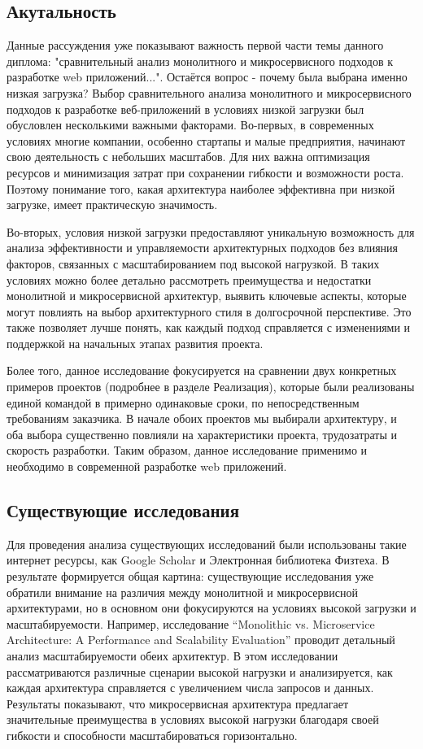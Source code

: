 \subsection{Акутальность}
    
    Данные рассуждения уже показывают важность первой части темы данного диплома: "сравнительный анализ монолитного и микросервисного подходов к разработке web приложений...". Остаётся вопрос - почему была выбрана именно низкая загрузка? Выбор сравнительного анализа монолитного и микросервисного подходов к разработке веб-приложений в условиях низкой загрузки был обусловлен несколькими важными факторами. Во-первых, в современных условиях многие компании, особенно стартапы и малые предприятия, начинают свою деятельность с небольших масштабов. Для них важна оптимизация ресурсов и минимизация затрат при сохранении гибкости и возможности роста. Поэтому понимание того, какая архитектура наиболее эффективна при низкой загрузке, имеет практическую значимость.

    Во-вторых, условия низкой загрузки предоставляют уникальную возможность для анализа эффективности и управляемости архитектурных подходов без влияния факторов, связанных с масштабированием под высокой нагрузкой. В таких условиях можно более детально рассмотреть преимущества и недостатки монолитной и микросервисной архитектур, выявить ключевые аспекты, которые могут повлиять на выбор архитектурного стиля в долгосрочной перспективе. Это также позволяет лучше понять, как каждый подход справляется с изменениями и поддержкой на начальных этапах развития проекта.

    Более того, данное исследование фокусируется на сравнении двух конкретных примеров проектов (подробнее в разделе Реализация), которые были реализованы единой командой в примерно одинаковые сроки, по непосредственным требованиям заказчика. В начале обоих проектов мы выбирали архитектуру, и оба выбора существенно повлияли на характеристики проекта, трудозатраты и скорость разработки. Таким образом, данное исследование применимо и необходимо в современной разработке web приложений.

\subsection{Существующие исследования}
    Для проведения анализа существующих исследований были использованы такие интернет ресурсы, как Google Scholar и Электронная библиотека Физтеха. В результате формируется общая картина: существующие исследования уже обратили внимание на различия между монолитной и микросервисной архитектурами, но в основном они фокусируются на условиях высокой загрузки и масштабируемости. Например, исследование “Monolithic vs. Microservice Architecture: A Performance and Scalability Evaluation” \cite{blinowski2022monolithic} проводит детальный анализ масштабируемости обеих архитектур. В этом исследовании рассматриваются различные сценарии высокой нагрузки и анализируется, как каждая архитектура справляется с увеличением числа запросов и данных. Результаты показывают, что микросервисная архитектура предлагает значительные преимущества в условиях высокой нагрузки благодаря своей гибкости и способности масштабироваться горизонтально.

